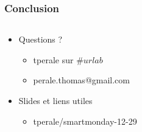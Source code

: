 \begin{frame}[t]
\frametitle{Conclusion}
\begin{columns}
\begin{column}{0.5\textwidth}
\begin{itemize}
  \item Questions ?
  \begin{itemize}
    \item tperale sur $\#urlab$
    \item perale.thomas@gmail.com
  \end{itemize}
  \item Slides et liens utiles
  \begin{itemize}
    \item tperale/smartmonday-12-29
  \end{itemize}
\end{itemize}
\end{column}
\begin{column}{0.5\textwidth}
\end{column}
\end{columns}
\end{frame}
